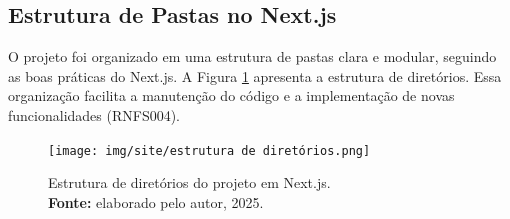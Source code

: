     \subsection{Estrutura de Pastas no Next.js} O projeto foi organizado em uma estrutura de pastas clara e modular, seguindo as boas práticas do Next.js. A Figura \ref{fig:estrutura_pastas} apresenta a estrutura de diretórios. Essa organização facilita a manutenção do código e a implementação de novas funcionalidades (RNFS004).

\begin{figure}[H]
    \centering
    \texttt{[image: img/site/estrutura de diretórios.png]}
    \caption{ Estrutura de diretórios do projeto em Next.js. \\
        \textbf{Fonte:} elaborado pelo autor, 2025.}
    \label{fig:estrutura_pastas}
\end{figure}

